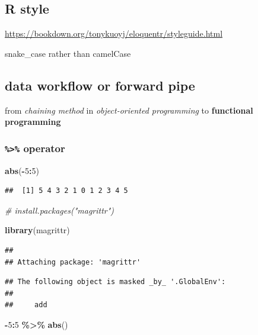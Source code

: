 \documentclass[
]{book}
\newenvironment{Shaded}{\begin{snugshade}}{\end{snugshade}}
\newcommand{\CommentTok}[1]{\textcolor[rgb]{0.56,0.35,0.01}{\textit{#1}}}
\newcommand{\DecValTok}[1]{\textcolor[rgb]{0.00,0.00,0.81}{#1}}
\newcommand{\FunctionTok}[1]{\textcolor[rgb]{0.13,0.29,0.53}{\textbf{#1}}}
\newcommand{\NormalTok}[1]{#1}
\newcommand{\SpecialCharTok}[1]{\textcolor[rgb]{0.81,0.36,0.00}{\textbf{#1}}}
\theoremstyle{definition}
\theoremstyle{definition}
\theoremstyle{definition}
\theoremstyle{definition}
\theoremstyle{remark}
\begin{document}
\subsection{R style}\label{r-style}

\url{https://bookdown.org/tonykuoyj/eloquentr/styleguide.html}

snake\_case rather than camelCase

\subsection{data workflow or forward pipe}\label{data-workflow-or-forward-pipe}

from \emph{chaining method} in \emph{object-oriented programming}
to \textbf{functional programming}

\subsubsection{\texorpdfstring{\texttt{\%\textgreater{}\%} operator}{\%\textgreater\% operator}}\label{operator}

\begin{Shaded}
\begin{Highlighting}[]
\FunctionTok{abs}\NormalTok{(}\SpecialCharTok{{-}}\DecValTok{5}\SpecialCharTok{:}\DecValTok{5}\NormalTok{)}
\end{Highlighting}
\end{Shaded}

\begin{verbatim}
##  [1] 5 4 3 2 1 0 1 2 3 4 5
\end{verbatim}

\begin{Shaded}
\begin{Highlighting}[]
\CommentTok{\# install.packages("magrittr")}

\FunctionTok{library}\NormalTok{(magrittr)}
\end{Highlighting}
\end{Shaded}

\begin{verbatim}
## 
## Attaching package: 'magrittr'
\end{verbatim}

\begin{verbatim}
## The following object is masked _by_ '.GlobalEnv':
## 
##     add
\end{verbatim}

\begin{Shaded}
\begin{Highlighting}[]
\SpecialCharTok{{-}}\DecValTok{5}\SpecialCharTok{:}\DecValTok{5} \SpecialCharTok{\%\textgreater{}\%} \FunctionTok{abs}\NormalTok{()}
\end{Highlighting}
\end{Shaded}
\end{document}
